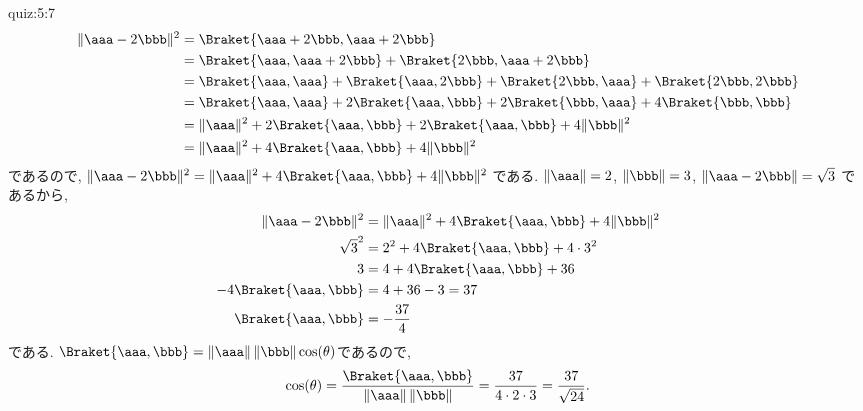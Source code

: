 \begin{answerof}{quiz:5:7}
  \begin{align*}
    \|\aaa-2\bbb\|^2
    &=\Braket{\aaa+2\bbb,\aaa+2\bbb}\\
    &=\Braket{\aaa,\aaa+2\bbb}+\Braket{2\bbb,\aaa+2\bbb}\\
    &=\Braket{\aaa,\aaa}+\Braket{\aaa,2\bbb}+\Braket{2\bbb,\aaa}+\Braket{2\bbb,2\bbb}\\
    &=\Braket{\aaa,\aaa}+2\Braket{\aaa,\bbb}+2\Braket{\bbb,\aaa}+4\Braket{\bbb,\bbb}\\
    &=\|\aaa\|^2+2\Braket{\aaa,\bbb}+2\Braket{\aaa,\bbb}+4\|\bbb\|^2\\
    &=\|\aaa\|^2+4\Braket{\aaa,\bbb}+4\|\bbb\|^2
  \end{align*}
  であるので,
  $\|\aaa-2\bbb\|^2=\|\aaa\|^2+4\Braket{\aaa,\bbb}+4\|\bbb\|^2$
  である.
  $\|\aaa\|=2$,
  $\|\bbb\|=3$,
  $\|\aaa-2\bbb\|=\sqrt{3}$
  であるから,
  \begin{align*}
    \|\aaa-2\bbb\|^2&=\|\aaa\|^2+4\Braket{\aaa,\bbb}+4\|\bbb\|^2\\
    \sqrt{3}^2&=2^2+4\Braket{\aaa,\bbb}+4\cdot 3^2\\
    3&=4+4\Braket{\aaa,\bbb}+36\\
    -4\Braket{\aaa,\bbb}&=4+36-3=37\\
    \Braket{\aaa,\bbb}&=-\frac{37}{4}\\
  \end{align*}
  である.
  $\Braket{\aaa,\bbb}=\left\|\aaa\right\|\left\|\bbb\right\|\cos(\theta)$であるので,
  \begin{align*}
    \cos(\theta)=\frac{\Braket{\aaa,\bbb}}{\left\|\aaa\right\|\left\|\bbb\right\|}
=\frac{37}{4\cdot 2\cdot 3}
=\frac{37}{\sqrt{24}}.
  \end{align*}
  
\end{answerof}

